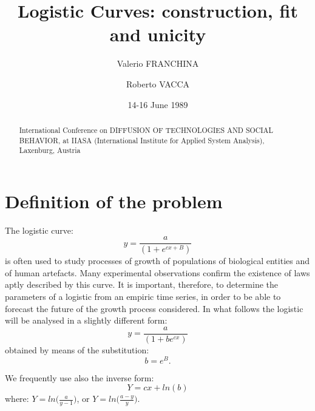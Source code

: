 \documentclass[%
 aip,
 jmp,%
 amsmath,amssymb,
 reprint,%
]{revtex4-1}
\begin{document}

\title[LOGISTIC CURVES: CONSTRUCTION, FIT  AND UNICITY]{Logistic Curves: construction, fit and unicity}%
\author{Valerio FRANCHINA}
\author{Roberto VACCA}

\date{14-16 June 1989}%

\begin{abstract}
International Conference on DIFFUSION OF  TECHNOLOGIES AND SOCIAL BEHAVIOR, at IIASA (International Institute for Applied System Analysis), Laxenburg, Austria
%
\end{abstract}

\maketitle


\section{\label{sec:level1}Definition of the problem}

The logistic curve: \[ y = \frac{a}{(1 + e^{cx + B})} \] is often used to study processes of growth of populations of  biological entities and of human artefacts. Many experimental observations  confirm the existence of laws aptly described by this curve. It is important, therefore, to  determine the parameters  of a  logistic from an empiric time series, in order to be able to forecast the  future of the growth process considered.
In what follows the logistic will be analysed in a slightly different form:
\[ y = \frac{a}{(1 + be^{cx})} \] obtained by means of the substitution: \[ b = e^B.\]

We frequently use also the inverse form:\[Y = cx + ln(b)\] where: $Y = ln\big(\frac{a}{y - 1}\big)$, or $Y = ln\big(\frac{a - y}{y}\big)$.\\
\end{document}
